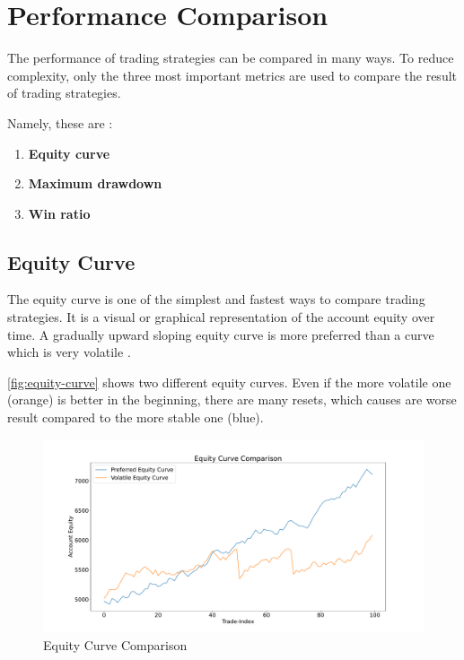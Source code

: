 \section{Performance Comparison}
\label{chap:performance}

The performance of trading strategies can be compared in many ways.
To reduce complexity, only the three most important metrics are used to compare the result of trading strategies.

Namely, these are \cite{performace}:

\begin{enumerate}
    \item \textbf{Equity curve}
    \item \textbf{Maximum drawdown}
    \item \textbf{Win ratio}
\end{enumerate}

\subsection{Equity Curve}
\label{chap:equity-curve}

The equity curve is one of the simplest and fastest ways to compare trading strategies.
It is a visual or graphical representation of the account equity over time.
A gradually upward sloping equity curve is more preferred than a curve which is very volatile \cite{performace}.

\autoref{fig:equity-curve} shows two different equity curves.
Even if the more volatile one (orange) is better in the beginning, there are many resets, which causes are worse result compared to the more stable one (blue).

\begin{figure}[H]
    \centering
    \includegraphics[width=\textwidth]{images/trading-strategies/equity-curve}
    \caption{Equity Curve Comparison}
    \label{fig:equity-curve}
\end{figure}

